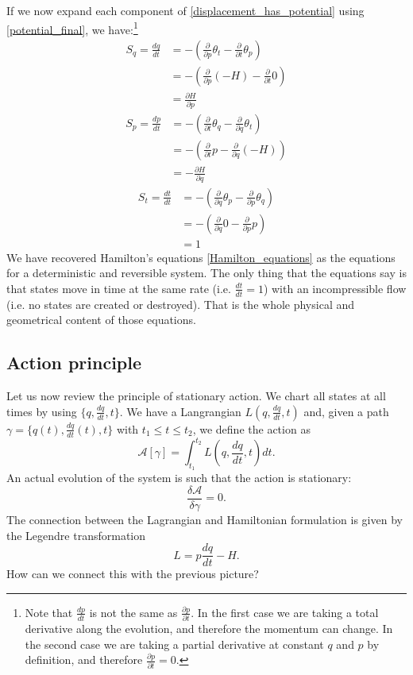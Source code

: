 \documentclass[10pt,twocolumn, nofootinbib]{revtex4-2}
\begin{document}
If we now expand each component of \ref{displacement_has_potential} using \ref{potential_final}, we have:\footnote{Note that $\frac{dp}{dt}$ is not the same as $\frac{\partial p}{\partial t}$. In the first case we are taking a total derivative along the evolution, and therefore the momentum can change. In the second case we are taking a partial derivative at constant $q$ and $p$ by definition, and therefore $\frac{\partial p}{\partial t}=0$.}
\begin{align*}
	S_q = \frac{dq}{dt}
	&= - \left( \frac{\partial}{\partial p} \theta_t - \frac{\partial}{\partial t} \theta_p \right) \\
	&= - \left( \frac{\partial}{\partial p} (-H) - \frac{\partial}{\partial t} 0 \right) \\
	& = \frac{\partial H}{\partial p}
\end{align*}
\begin{align*}
	S_p = \frac{dp}{dt}
	&= - \left( \frac{\partial}{\partial t} \theta_q - \frac{\partial}{\partial q} \theta_t \right) \\
	&= - \left( \frac{\partial}{\partial t} p - \frac{\partial}{\partial q} (-H) \right) \\
	& = - \frac{\partial H}{\partial q}
\end{align*}
\begin{align*}
	S_t = \frac{dt}{dt}
	&= - \left( \frac{\partial}{\partial q} \theta_p - \frac{\partial}{\partial p} \theta_q \right) \\
	&= - \left( \frac{\partial}{\partial q} 0 - \frac{\partial}{\partial p} p \right) \\
	& = 1
\end{align*}
We have recovered Hamilton's equations \ref{Hamilton_equations} as the equations for a deterministic and reversible system. The only thing that the equations say is that states move in time at the same rate (i.e. $\frac{dt}{dt} = 1$) with an incompressible flow (i.e. no states are created or destroyed). That is the whole physical and geometrical content of those equations.

\subsection{Action principle}

Let us now review the principle of stationary action. We chart all states at all times by using $\{q, \frac{dq}{dt}, t\}$. We have a Langrangian $L(q, \frac{dq}{dt}, t)$ and, given a path $\gamma = \{q(t), \frac{dq}{dt}(t), t\}$ with $t_1 \leq t \leq t_2$, we define the action as
\begin{equation}
	\mathcal{A}[\gamma] = \int_{t_1}^{t_2} L(q, \frac{dq}{dt}, t) dt.
\end{equation}  An actual evolution of the system is such that the action is stationary:
\begin{equation}
	\frac{\delta \mathcal{A}}{\delta \gamma} = 0.
\end{equation}
The connection between the Lagrangian and Hamiltonian formulation is given by the Legendre transformation
\begin{equation}
	L = p \frac{dq}{dt} - H.
\end{equation}
How can we connect this with the previous picture?
\end{document}
